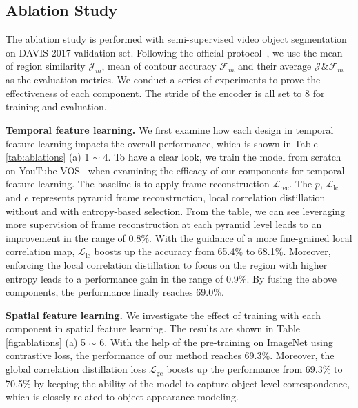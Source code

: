 \documentclass{article}
\begin{document}
 \subsection{Ablation Study}
 The ablation study is performed with semi-supervised video object segmentation~\cite{pont20172017} on DAVIS-2017 validation set. Following the official protocol~\cite{pont20172017}, we use the mean of region similarity $\mathcal{J}_m$, mean of contour accuracy $\mathcal{F}_m$ and their average $\mathcal{J} \& \mathcal{F}_m$ as the evaluation metrics. We conduct a series of experiments to prove the effectiveness of each component. The stride of the encoder is all set to 8 for training and evaluation.
 
 
 \textbf{Temporal feature learning.} We first examine how each design in temporal feature learning impacts the overall performance, which is shown in Table \ref{tab:ablations} (a) 1 $\sim$ 4. To have a clear look, we train the model from scratch on YouTube-VOS~\cite{xu2018youtube} when examining the efficacy of our components for temporal feature learning. The baseline is to apply frame reconstruction $\mathcal{L}_{\mathrm{rec}}$. The $p$, $\mathcal{L}_{\mathrm{lc}}$ and $e$ represents pyramid frame reconstruction, local correlation distillation without and with entropy-based selection. From the table, we can see leveraging more supervision of frame reconstruction at each pyramid level leads to an improvement in the range of 0.8\%. With the guidance of a more fine-grained local correlation map, $\mathcal{L}_{\mathrm{lc}}$ boosts up the accuracy from 65.4\% to 68.1\%. Moreover, enforcing the local correlation distillation to focus on the region with higher entropy leads to a performance gain in the range of 0.9\%. By fusing the above components, the performance finally reaches 69.0\%.
 
 \textbf{Spatial feature learning.} We investigate the effect of training with each component in spatial feature learning. The results are shown in Table \ref{fig:ablations} (a) 5 $\sim$ 6. With the help of the pre-training on ImageNet using contrastive loss, the performance of our method reaches 69.3\%. Moreover, the global correlation distillation loss $\mathcal{L}_{\mathrm{gc}}$ boosts up the performance from 69.3\% to 70.5\% by keeping the ability of the model to capture object-level correspondence, which is closely related to object appearance modeling.
 
\end{document}
